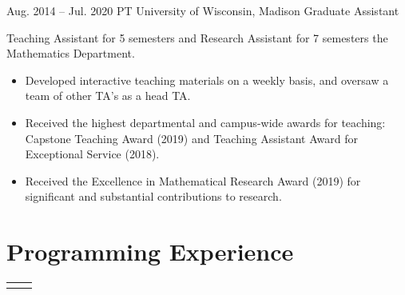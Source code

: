 \documentclass[
	10pt, %
]{FreemanCV}
\begin{document}
\begin{paracol}{2}

\jobentry
	{Aug. 2014 -- Jul. 2020} %
	{PT} %
	{University of Wisconsin, Madison} %
	{Graduate Assistant} %
	{Teaching Assistant for 5 semesters and Research Assistant for 7 semesters the Mathematics Department.
	\begin{itemize}[leftmargin=*]
	\item Developed interactive teaching materials on a weekly basis, and oversaw a team of  other TA's as a head TA. \vspace{-.4em}
	\item Received the highest departmental and campus-wide awards for teaching: Capstone Teaching Award (2019) and  Teaching Assistant Award for Exceptional Service (2018). \vspace{-.4em}
	\item Received the Excellence in Mathematical Research Award (2019) for significant and substantial contributions to research.
	\end{itemize}
	} %


\section{Programming Experience} 




\begin{supertabular}{r l} %
	
	
	
	
	

\end{supertabular}
\end{paracol}
\end{document}

